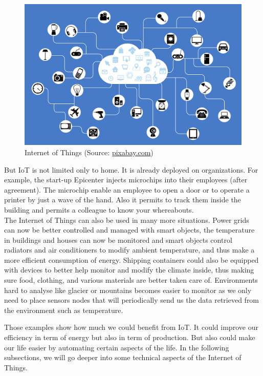 \begin{figure}
  \centering
  \includegraphics[width=\textwidth]{res/iot.png}
  \caption{Internet of Things (Source: \url{pixabay.com})}
  \label{fig:iot}
\end{figure}

But IoT is not limited only to home. It is already deployed on organizations. For example, the start-up Epicenter injects microchips into their employees (after agreement)\cite{website:lat_04_17}. The microchip enable an employee to open a door or to operate a printer by just a wave of the hand. Also it permits to track them inside the building and permits a colleague to know your whereabouts. \\

The Internet of Things can also be used in many more situations. Power grids can now be better controlled and managed with smart objects, the temperature in buildings and houses can now be monitored and smart objects control radiators and air conditioners to modify ambient temperature, and thus make a more efficient consumption of energy. Shipping containers could also be equipped with devices to better help monitor and modify the climate inside, thus making sure food, clothing, and various materials are better taken care of. Environments hard to analyse like glacier or mountains becomes easier to monitor as we only need to place sensors nodes that will periodically send us the data retrieved from the environment such as temperature. \\


Those examples show how much we could benefit from IoT. It could improve our efficiency in term of energy but also in term of production. But also could make our life easier by automating certain aspects of the life. In the following subsections, we will go deeper into some technical aspects of the Internet of Things. \\

